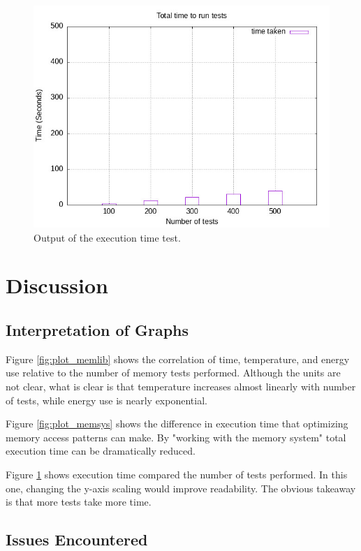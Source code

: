 \documentclass[12pt]{article}
\begin{document}
\begin{figure}[htbp]
\centering
\includegraphics[width=1.0\textwidth]{../../data/ee_course/plot_tests.jpg} %
\caption{Output of the execution time test.}
\label{fig:plot_time}
\end{figure}

\section{Discussion}\label{sec:discussion}

\subsection{Interpretation of Graphs}
Figure \ref{fig:plot_memlib} shows the correlation of time, temperature, and energy use relative to the number of memory tests performed. Although the units are not clear, what is clear is that temperature increases almost linearly with number of tests, while energy use is nearly exponential.

Figure \ref{fig:plot_memsys} shows the difference in execution time that optimizing memory access patterns can make. By "working with the memory system" total execution time can be dramatically reduced. 

Figure \ref{fig:plot_time} shows execution time compared the number of tests performed. In this one, changing the y-axis scaling would improve readability. The obvious takeaway is that more tests take more time. 

\subsection{Issues Encountered}
\end{document}
